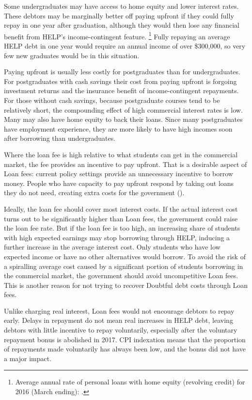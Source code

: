 \documentclass[embargoed]{grattan}
\begin{document}
Some undergraduates may have access to home equity and lower interest rates.
These debtors may be marginally better off paying upfront if they could fully repay in one year after graduation, although they would then lose any financial benefit from \gls{HELP}'s income-contingent feature.%
\footnote{Average annual rate of personal loans with home equity (revolving credit) for 2016 (March ending): \textcite{RBA2016F5Indicatorlending}.} Fully repaying an average \gls{HELP} debt in one year would require an annual income of over \$300,000, so very few new graduates would be in this situation.

Paying upfront is usually less costly for postgraduates than for undergraduates.
For postgraduates with cash savings their cost from paying upfront is forgoing investment returns and the insurance benefit of income-contingent repayments.
For those without cash savings, because postgraduate courses tend to be relatively short, the compounding effect of high commercial interest rates is low.
Many may also have home equity to back their loans.
Since many postgraduates have employment experience, they are more likely to have high incomes soon after borrowing than undergraduates.

Where the loan fee is high relative to what students can get in the commercial market, the fee provides an incentive to pay upfront.
That is a desirable aspect of \gls{Loan fees}: current policy settings provide an unnecessary incentive to borrow money.
People who have capacity to pay upfront respond by taking out loans they do not need, creating extra costs for the government ().

Ideally, the loan fee should cover most interest costs.
If the actual interest cost turns out to be significantly higher than \gls{Loan fees}, the government could raise the loan fee rate.
But if the loan fee is too high, an increasing share of students with high expected earnings may stop borrowing through \gls{HELP}, inducing a further increase in the average interest cost.
Only students who have low expected income or have no other alternatives would borrow.
To avoid the risk of a spiralling average cost caused by a significant portion of students borrowing in the commercial market, the government should avoid uncompetitive \gls{Loan fees}.
This is another reason for not trying to recover \gls{Doubtful debt} costs through \gls{Loan fees}.

Unlike charging real interest, \gls{Loan fees} would not encourage debtors to repay early.
Delays in repayment do not mean real increases in \gls{HELP} debt, leaving debtors with little incentive to repay voluntarily, especially after the voluntary repayment bonus is abolished in 2017.
\gls{CPI} indexation means that the proportion of repayments made voluntarily has always been low, and the bonus did not have a major impact.
\end{document}

